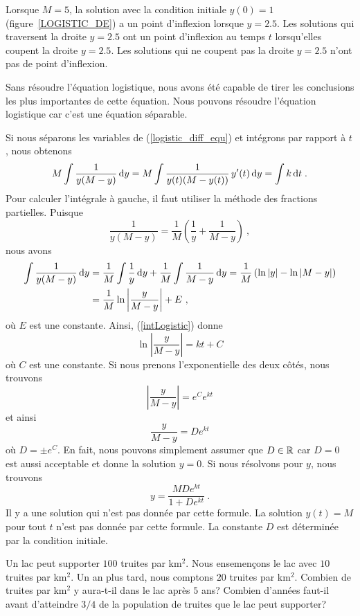 {Lorsque $M=5$, la solution avec la condition initiale $y(0)=1$
(figure~\ref{LOGISTIC_DE}) a un point d'inflexion
lorsque $y=2.5$.  Les solutions qui traversent la droite $y=2.5$ ont un
point d'inflexion au temps $t$ lorsqu'elles coupent la droite $y=2.5$.  Les
solutions qui ne coupent pas la droite $y=2.5$ n'ont pas de point
d'inflexion.

Sans résoudre l'équation logistique, nous avons été capable de tirer les
conclusions les plus importantes de cette équation.  Nous pouvons résoudre
l'équation logistique car c'est une équation séparable.

Si nous séparons les variables de (\ref{logistic_diff_equ}) et intégrons par
rapport à $t$, nous obtenons
\begin{equation}\label{intLogistic}
M \int \frac{1}{y(M-y)} \,\mathrm{d}y
= M \int \frac{1}{y(t)(M-y(t))}\, y'(t) \,\mathrm{d}y
= \int k \,\mathrm{d}t \; .
\end{equation}
Pour calculer l'intégrale à gauche, il faut utiliser la méthode des
fractions partielles.  Puisque
\[
\frac{1}{y(M-y)} = \frac{1}{M} \left(\frac{1}{y} + \frac{1}{M-y}\right) \ ,
\]
nous avons
\begin{align*}
\int \frac{1}{y(M-y)} \,\mathrm{d}y
&= \frac{1}{M} \int \frac{1}{y} \,\mathrm{d}y + \frac{1}{M} \int \frac{1}{M-y} \,\mathrm{d}y
= \frac{1}{M} \left(\ln|y| - \ln|M-y|\right) \\
&= \frac{1}{M} \ln\left|\frac{y}{M-y}\right| + E \ ,
\end{align*}
où $E$ est une constante.  Ainsi, (\ref{intLogistic}) donne
\[
\ln\left|\frac{y}{M-y}\right| = kt + C
\]
où $C$ est une constante.  Si nous prenons l'exponentielle des deux
côtés, nous trouvons
\[
  \left|\frac{y}{M-y}\right| = e^C e^{kt}
\]
et ainsi
\[
\frac{y}{M-y} = D e^{kt}
\]
où $D = \pm e^C$.  En fait, nous pouvons simplement assumer que
$D \in \mathbb{R}$ car $D=0$ est aussi acceptable et donne la solution $y=0$.
Si nous résolvons pour $y$, nous trouvons
\[
y = \frac{M D e^{kt}}{1+De^{kt}} \ .
\]
Il y a une solution qui n'est pas donnée par cette formule.  La
solution $y(t) = M$ pour tout $t$ n'est pas donnée par cette formule.
La constante $D$ est déterminée par la condition initiale.

\begin{egg}
Un lac peut supporter $100$ truites par km$^2$.  Nous ensemençons le lac avec
$10$ truites par km$^2$.  Un an plus tard, nous comptons $20$ truites par
km$^2$.  Combien de truites par km$^2$ y aura-t-il dans le lac après
$5$ ans?  Combien d'années faut-il avant d'atteindre $3/4$ de la
population de truites que le lac peut supporter?


\end{egg}}
